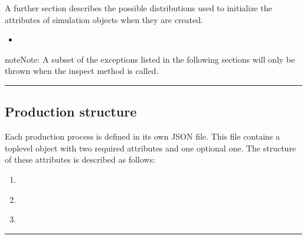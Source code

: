\documentclass[letterpaper,10pt,english]{sphinxmanual}
\begin{document}
\sphinxAtStartPar
A further section describes the possible distributions used to initialize the attributes of simulation objects when they
are created.
\begin{itemize}
\item {} 
\sphinxAtStartPar
{\hyperref[\detokenize{source/Interface_files/attribute_values:attr-values}]{}}

\end{itemize}

\begin{sphinxadmonition}{note}{Note:}
\sphinxAtStartPar
A subset of the exceptions listed in the following sections will only be thrown when the inspect method is called.
\end{sphinxadmonition}


\bigskip\hrule\bigskip



\subsection{Production structure}
\label{\detokenize{source/Interface_files/data_file:production-structure}}\label{\detokenize{source/Interface_files/data_file:data-file}}\label{\detokenize{source/Interface_files/data_file::doc}}
\sphinxAtStartPar
Each production process is defined in its own JSON file. This file contains a top\sphinxhyphen{}level object with two required
attributes and one optional one. The structure of these attributes is described as follows:
\begin{enumerate}
%
\item {} 
\sphinxAtStartPar
{\hyperref[\detokenize{source/Interface_files/data_file:order}]{}}

\item {} 
\sphinxAtStartPar
{\hyperref[\detokenize{source/Interface_files/data_file:station}]{}}

\item {} 
\sphinxAtStartPar
{\hyperref[\detokenize{source/Interface_files/data_file:factory2}]{}}

\end{enumerate}


\bigskip\hrule\bigskip
\end{document}
